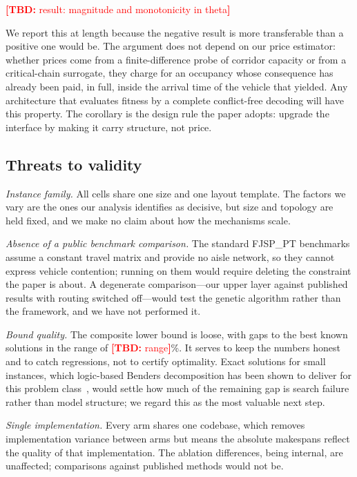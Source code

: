 \documentclass[manuscript,screen,review]{acmart}
\newcommand{\TBD}[1]{\textcolor{red}{\textbf{[TBD:} #1\textbf{]}}}
\begin{document}
\TBD{result: magnitude and monotonicity in theta}

We report this at length because the negative result is more transferable than
a positive one would be. The argument does not depend on our price estimator:
whether prices come from a finite-difference probe of corridor capacity or from
a critical-chain surrogate, they charge for an occupancy whose consequence has
already been paid, in full, inside the arrival time of the vehicle that
yielded. Any architecture that evaluates fitness by a complete conflict-free
decoding will have this property. The corollary is the design rule the paper
adopts: upgrade the interface by making it carry structure, not price.

\subsection{Threats to validity}
\label{sec:threats}

\emph{Instance family.} All cells share one size and one layout template. The
factors we vary are the ones our analysis identifies as decisive, but size and
topology are held fixed, and we make no claim about how the mechanisms scale.

\emph{Absence of a public benchmark comparison.} The standard FJSP\_PT
benchmarks assume a constant travel matrix and provide no aisle network, so
they cannot express vehicle contention; running on them would require deleting
the constraint the paper is about. A degenerate comparison---our upper layer
against published results with routing switched off---would test the genetic
algorithm rather than the framework, and we have not performed it.

\emph{Bound quality.} The composite lower bound is loose, with gaps to the best
known solutions in the range of \TBD{range}\%. It serves to keep the numbers
honest and to catch regressions, not to certify optimality. Exact solutions for
small instances, which logic-based Benders decomposition has been shown to
deliver for this problem class~\cite{vanos2026exact}, would settle how much of
the remaining gap is search failure rather than model structure; we regard this
as the most valuable next step.

\emph{Single implementation.} Every arm shares one codebase, which removes
implementation variance between arms but means the absolute makespans reflect
the quality of that implementation. The ablation differences, being internal,
are unaffected; comparisons against published methods would not be.
\end{document}
